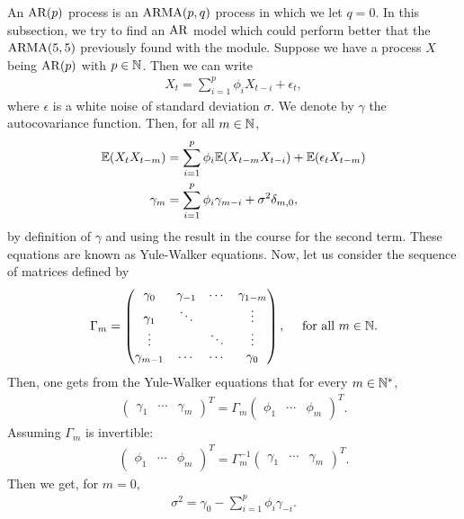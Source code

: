 An $\mathrm{AR}(p)$ process is an $\mathrm{ARMA}(p,q)$ process in which we let $q = 0$. In this subsection, we try to find an $\mathrm{AR}$ model which could perform better that the $\mathrm{ARMA}(5,5)$ previously found with the  module. Suppose we have a process $X$ being $\mathrm{AR}(p)$ with $p \in \mathbb{N}$. Then we can write
\begin{align*}
X_t = \sum_{i=1}^p \phi_i X_{t-i} + \epsilon_t,
\end{align*}
where $\epsilon$ is a white noise of standard deviation $\sigma$. We denote by $\gamma$ the autocovariance function. Then, for all $m \in \mathbb{N}$,
\begin{align*}
\mathbb{E}(X_t X_{t-m}) & = \sum_{i=1}^p \phi_i \mathbb{E}(X_{t-m} X_{t-i}) + \mathbb{E}(\epsilon_t X_{t-m}) \\
\gamma_m & = \sum_{i=1}^p \phi_i \gamma_{m-i} + \sigma^2 \delta_{m, 0},
\end{align*}
by definition of $\gamma$ and using the result in the course for the second term. These equations are known as Yule-Walker equations. Now, let us consider the sequence of matrices defined by
\begin{align*}
\Gamma_m = \begin{pmatrix}
\gamma_0 & \gamma_{-1} & \cdots & \gamma_{1-m} \\
\gamma_1 & \ddots & & \vdots \\
\vdots & & \ddots & \vdots \\
\gamma_{m-1} & \cdots & \cdots & \gamma_0
\end{pmatrix}, \quad \text{ for all } m \in \mathbb{N}.
\end{align*}
Then, one gets from the Yule-Walker equations that for every $m \in \mathbb{N}^*$,
\begin{align*}
\begin{pmatrix}
\gamma_1 & \cdots & \gamma_m
\end{pmatrix}^T = \Gamma_m \begin{pmatrix}
\phi_1 & \cdots & \phi_m
\end{pmatrix}^T.
\end{align*}
Assuming $\Gamma_m$ is invertible:
\begin{align*}
\begin{pmatrix}
\phi_1 & \cdots & \phi_m
\end{pmatrix}^T = \Gamma_m^{-1} \begin{pmatrix}
\gamma_1 & \cdots & \gamma_m
\end{pmatrix}^T.
\end{align*}
Then we get, for $m=0$,
\begin{align*}
\sigma^2 = \gamma_0 - \sum_{i=1}^p \phi_i \gamma_{-i}.
\end{align*}
